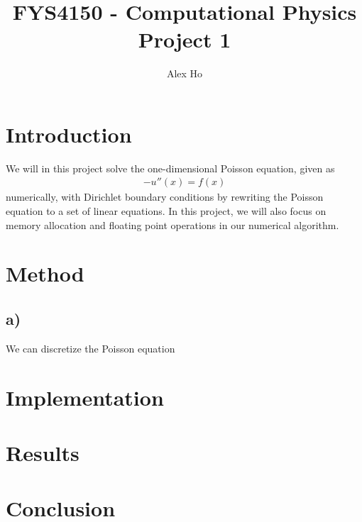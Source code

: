 \documentclass[12pt]{article}
\author{Alex Ho}
\title{FYS4150 - Computational Physics \\ Project 1}
\begin{document}
\maketitle
\section{Introduction}
We will in this project solve the one-dimensional Poisson equation, given as
\begin{align}
-u''(x) = f(x)
\end{align}
numerically, with Dirichlet boundary conditions by rewriting the Poisson equation to a set of linear equations. In this project, we will also focus on memory allocation and floating point operations in our numerical algorithm.
\section{Method}
\subsection*{a)}
We can discretize the Poisson equation 
\section{Implementation}
\section{Results}
\section{Conclusion}
\end{document}

